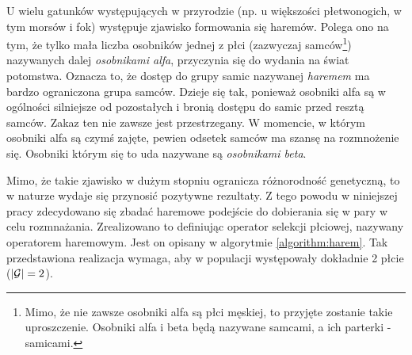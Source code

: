 \documentclass[./FM_mgr.tex]{subfiles}
\begin{document}
U wielu gatunków występujących w przyrodzie (np. u większości płetwonogich\cite{pletwonogiMajaHaremy}, w tym morsów i fok) występuje zjawisko formowania się haremów.
Polega ono na tym, że tylko mała liczba osobników jednej z płci (zazwyczaj samców\footnote{
	Mimo, że nie zawsze osobniki alfa są płci męskiej, to przyjęte zostanie takie uproszczenie. 
	Osobniki alfa i beta będą nazywane samcami, a ich parterki - samicami.
}) nazywanych dalej \emph{osobnikami alfa}, przyczynia się do wydania na świat potomstwa.
Oznacza to, że dostęp do grupy samic nazywanej \emph{haremem} ma bardzo ograniczona grupa samców.
Dzieje się tak, ponieważ osobniki alfa są w ogólności silniejsze od pozostałych i bronią dostępu do samic przed resztą samców.
Zakaz ten nie zawsze jest przestrzegany.
W momencie, w którym osobniki alfa są czymś zajęte, pewien odsetek samców ma szansę na rozmnożenie się.
Osobniki którym się to uda nazywane są \emph{osobnikami beta}.

Mimo, że takie zjawisko w dużym stopniu ogranicza różnorodność genetyczną, to w naturze wydaje się przynosić pozytywne rezultaty.
Z tego powodu w niniejszej pracy zdecydowano się zbadać haremowe podejście do dobierania się w pary w celu rozmnażania.
Zrealizowano to definiując operator selekcji płciowej, nazywany operatorem haremowym. Jest on opisany w algorytmie \ref{algorithm:harem}. 
Tak przedstawiona realizacja wymaga, aby w populacji występowały dokładnie 2 płcie ($|\mathcal{G}| = 2$).
\end{document}
